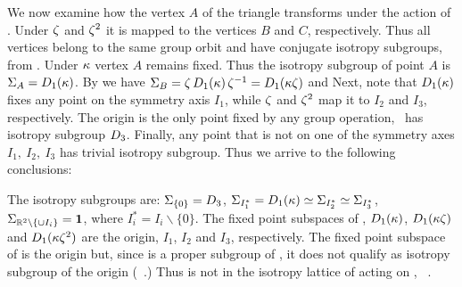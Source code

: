 \begin{example}  %
We now examine how the vertex $A$ of the triangle transforms
under the action of . Under $\zeta$ and $\zeta^2$ it is
mapped to the vertices $B$ and $C$, respectively.
Thus all vertices belong to the same group orbit and have
conjugate isotropy subgroups, from .
Under $\kappa$ vertex $A$ remains fixed. Thus the isotropy
subgroup of point $A$ is $\Sigma_{A}=D_1(\kappa)$. By
 we have $\Sigma_{B}=\zeta\,
D_1(\kappa)\, \zeta^{-1} = D_1(\kappa\zeta)$
and
Next, note that $D_1(\kappa)$ fixes
any point on the symmetry axis $I_1$, while $\zeta$ and
$\zeta^2$ map it to $I_2$ and $I_3$, respectively. The origin
is the only point fixed by any group operation, \ie~has
isotropy subgroup $D_{3}$. Finally, any point that is not on
one of the symmetry axes $I_1,\ I_2,\ I_3$ has trivial isotropy
subgroup. Thus we arrive to the following conclusions:

The isotropy subgroups are: $\Sigma_{\{0\}}=D_{3}$,
$\Sigma_{I_1^*}=D_1(\kappa)\simeq\Sigma_{I_2^*}\simeq\Sigma_{I_3^*}$,
$\Sigma_{\mathbb{R}^{2}\backslash\{\cup I_i\}}=\mathbf{1}$, where $I_i^*=I_i\backslash\{0\}$. The fixed point
subspaces of , $D_1(\kappa)$, $D_1(\kappa\zeta)$ and
$D_1(\kappa\zeta^2)$ are the origin, $I_1$, $I_2$ and $I_3$,
respectively. The fixed point subspace of  is the origin
but, since  is a proper subgroup of , it
does not qualify as isotropy subgroup of the origin
(\cf~.) Thus  is not in the isotropy
lattice of  acting on ,
\cf~.


\end{example}
